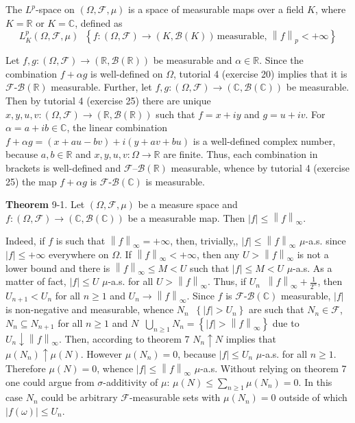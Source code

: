 \documentclass[a4paper]{article}
\newcommand{\obj}[1]{\left\{ #1 \right \}}
\newcommand{\brac}[1]{\left ( #1 \right )}
\newcommand{\abs}[1]{\left | #1 \right |}
\newcommand{\nrm}[1]{\left\| #1 \right \|}
\newcommand{\Real}{\mathbb{R}}
\newcommand{\Cplx}{\mathbb{C}}
\newcommand{\Fcal}{\mathcal{F}}
\newcommand{\borel}[1]{\mathcal{B}\brac{#1}}
\newcommand{\defn}{\mathop{\overset{\Delta}{=}}\nolimits}
\begin{document}
The $L^p$-space on $\brac{\Omega, \Fcal, \mu}$ is a space of measurable maps over a field $K$, where $K=\Real$ or $K=\Cplx$, defined as \[L^p_K\brac{\Omega, \Fcal, \mu} \defn \obj{ f:\brac{\Omega, \Fcal}\to\brac{K, \borel{K}}\,\text{measurable},\,\nrm{f}_p < +\infty }\]

Let $f,g:\brac{\Omega, \Fcal}\to\brac{\Real, \borel{\Real}}$ be measurable and $\alpha\in \Real$. Since the combination $f+\alpha g$ is well-defined on $\Omega$, tutorial 4 (exercise 20) implies that it is $\Fcal$-$\borel{\Real}$ measurable. Further, let $f,g:\brac{\Omega, \Fcal}\to\brac{\Cplx, \borel{\Cplx}}$ be measurable. Then by tutorial 4 (exercise 25) there are unique $x, y, u, v:\brac{\Omega, \Fcal}\to\brac{\Real, \borel{\Real}}$ such that $f=x + i y$ and $g = u + i v$. For $\alpha = a + i b\in \Cplx$, the linear combination $f+\alpha g = \brac{ x + a u - b v } + i \brac{ y + a v + b u }$ is a well-defined complex number, because $a,b\in \Real$ and $x,y,u,v:\Omega\to \Real$ are finite. Thus, each combination in brackets is well-defined and $\Fcal$--$\borel{\Real}$ measurable, whence by tutorial 4 (exercise 25) the map $f+\alpha g$ is $\Fcal$-$\borel{\Cplx}$ is measurable.

\label{thm:l_infty_norm_muas_prop} \noindent \textbf{Theorem} 9-1.
Let $\brac{\Omega, \Fcal, \mu}$ be a measure space and $f:\brac{\Omega, \Fcal}\to\brac{\Cplx, \borel{\Cplx}}$ be a measurable map. Then $\abs{f}\leq \nrm{f}_\infty$.

Indeed, if $f$ is such that $\nrm{f}_\infty=+\infty$, then, trivially,, $\abs{f}\leq \nrm{f}_\infty$ $\mu$-a.s. since $\abs{f}\leq +\infty$ everywhere on $\Omega$. If $\nrm{f}_\infty < +\infty$, then any $U>\nrm{f}_\infty$ is not a lower bound and there is $\nrm{f}_\infty\leq M < U$ such that $\abs{f}\leq M < U$ $\mu$-a.s. As a matter of fact, $\abs{f} \leq U$ $\mu$-a.s. for all $U>\nrm{f}_\infty$. Thus, if $U_n\defn \nrm{f}_\infty + \frac{1}{2^n}$, then $U_{n+1}<U_n$ for all $n\geq 1$ and $U_n\to \nrm{f}_\infty$. Since $f$ is $\Fcal$-$\borel{\Cplx}$ measurable, $\abs{f}$ is non-negative and measurable, whence $N_n\defn \obj{ \abs{f} > U_n}$ are such that $N_n\in \Fcal$, $N_n\subseteq N_{n+1}$ for all $n\geq 1$ and $N\defn \bigcup_{n\geq 1} N_n = \obj{ \abs{f} > \nrm{f}_\infty }$ due to $U_n\downarrow \nrm{f}_\infty$. Then, according to theorem 7 $N_n\uparrow N$ implies that $\mu\brac{N_n}\uparrow \mu\brac{N}$. However $\mu\brac{N_n}=0$, because $\abs{f}\leq U_n$ $\mu$-a.s. for all $n\geq 1$. Therefore $\mu\brac{N} = 0$, whence $\abs{f} \leq \nrm{f}_\infty$ $\mu$-a.s. Without relying on theorem 7 one could argue from $\sigma$-additivity of $\mu$: $\mu\brac{N}\leq \sum_{n\geq 1} \mu\brac{N_n} = 0$. In this case $N_n$ could be arbitrary $\Fcal$-measurable sets with $\mu\brac{N_n}=0$ outside of which $\abs{f\brac{\omega}}\leq U_n$.\\
\end{document}
